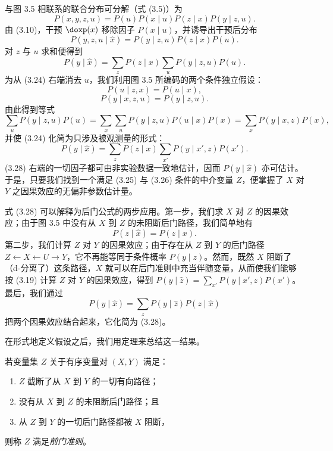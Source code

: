 与图 3.5 相联系的联合分布可分解（式 \textup{(3.5)}）为
\begin{equation}
P(x,y,z,u) = P(u)P(x\mid u)P(z\mid x)P(y\mid z,u). \tag{3.22}
\end{equation}
由 \textup{(3.10)}，干预 $\doxp(x)$ 移除因子 $P(x\mid u)$，并诱导出干预后分布
\begin{equation}
P(y,z,u\mid\hat{x}) = P(y\mid z,u)P(z\mid x)P(u). \tag{3.23}
\end{equation}
对 $z$ 与 $u$ 求和便得到
\begin{equation}
P(y\mid\hat{x}) = \sum_{z}P(z\mid x)\sum_{u}P(y\mid z,u)P(u). \tag{3.24}
\end{equation}
为从 \textup{(3.24)} 右端消去 $u$，我们利用图 3.5 所编码的两个条件独立假设：
\begin{equation}
P(u\mid z,x) = P(u\mid x), \tag{3.25}
\end{equation}
\begin{equation}
P(y\mid x,z,u) = P(y\mid z,u). \tag{3.26}
\end{equation}
由此得到等式
\begin{equation}
\sum_{u}P(y\mid z,u)P(u) = \sum_{x}\sum_{u}P(y\mid z,u)P(u\mid x)P(x) = \sum_{x}P(y\mid x,z)P(x), \tag{3.27}
\end{equation}
并使 \textup{(3.24)} 化简为只涉及被观测量的形式：
\begin{equation}
P(y\mid\hat{x}) = \sum_{z}P(z\mid x)\sum_{x'}P(y\mid x',z)P(x'). \tag{3.28}
\end{equation}
\textup{(3.28)} 右端的一切因子都可由非实验数据一致地估计，因而 $P(y\mid\hat{x})$ 亦可估计。于是，只要我们找到一个满足 \textup{(3.25)} 与 \textup{(3.26)} 条件的中介变量 $Z$，便掌握了 $X$ 对 $Y$ 之因果效应的无偏非参数估计量。

式 \textup{(3.28)} 可以解释为后门公式的两步应用。第一步，我们求 $X$ 对 $Z$ 的因果效应；由于图 3.5 中没有从 $X$ 到 $Z$ 的未阻断后门路径，我们简单地有
\[
P(z\mid\hat{x})=P(z\mid x).
\]
第二步，我们计算 $Z$ 对 $Y$ 的因果效应；由于存在从 $Z$ 到 $Y$ 的后门路径 $Z\leftarrow X\leftarrow U\to Y$，它不再能等同于条件概率 $P(y\mid z)$。然而，既然 $X$ 阻断了（d-分离了）这条路径，$X$ 就可以在后门准则中充当伴随变量，从而使我们能够按 \textup{(3.19)} 计算 $Z$ 对 $Y$ 的因果效应，得到 $P(y\mid\hat{z})=\sum_{x'}P(y\mid x',z)P(x')$。最后，我们通过
\[
P(y\mid\hat{x})=\sum_z P(y\mid\hat{z})P(z\mid\hat{x})
\]
把两个因果效应结合起来，它化简为 \textup{(3.28)}。

在形式地定义假设之后，我们用定理来总结这一结果。

\begin{definition}[前门]
若变量集 $Z$ 关于有序变量对 $(X,Y)$ 满足：
\begin{enumerate}[label=(\roman*),leftmargin=2.2em]
\item $Z$ 截断了从 $X$ 到 $Y$ 的一切有向路径；
\item 没有从 $X$ 到 $Z$ 的未阻断后门路径；且
\item 从 $Z$ 到 $Y$ 的一切后门路径都被 $X$ 阻断，
\end{enumerate}
则称 $Z$ 满足\emph{前门准则}。
\end{definition}

